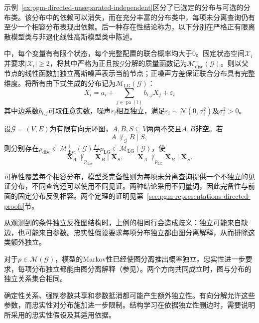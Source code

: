 示例~\ref{ex:pgm-directed-unseparated-independent}区分了已选定的分布与可选的分布类。该分布中的依赖可以消失，而在充分丰富的分布类中，每项未分离查询仍有至少一个相容分布表现出依赖。后一种存在性结论称为，以下分别在严格正有限离散模型类与非退化线性高斯模型类中陈述。

中，每个变量有有限个状态，每个完整配置的联合概率均大于$0$。固定状态空间$\mathcal{X}_i$并要求$|\mathcal{X}_i|\geq2$，将其中严格为正且按$\mathcal{G}$分解的质量函数记为$\mathcal{M}_{\mathrm{disc}}^{+}(\mathcal{G})$。则以父节点的线性函数加独立高斯噪声表示当前节点；正噪声方差保证联合分布具有完整维度。将所有由下式生成的分布记为$\mathcal{M}_{\mathrm{LG}}(\mathcal{G})$：
\[
  X_i=a_i+\sum_{j\in\operatorname{pa}(i)}b_{i,j}X_j+\varepsilon_i
\]
其中边系数$b_{i,j}$可取任意实数，噪声$\varepsilon_i$相互独立，满足$\varepsilon_i\sim\mathcal{N}(0,\sigma_i^2)$及$\sigma_i^2>0$。

\begin{theorem}[d-分离在特定模型类中的完备性]
  \label{thm:pgm-directed-completeness}
  设$\mathcal{G}=(V,E)$为有限有向无环图，$A,B,S\subseteq V$两两不交且$A,B$非空。若
  \[
    A\not\perp_{\mathcal{G}}B\mid S,
  \]
  则分别存在$p_{\mathrm{disc}}\in\mathcal{M}_{\mathrm{disc}}^{+}(\mathcal{G})$与$p_{\mathrm{LG}}\in\mathcal{M}_{\mathrm{LG}}(\mathcal{G})$，使
  \begin{equation}
    \bm{X}_A\not\perp_{p_{\mathrm{disc}}}\bm{X}_B\mid\bm{X}_S,
    \qquad
    \bm{X}_A\not\perp_{p_{\mathrm{LG}}}\bm{X}_B\mid\bm{X}_S.
    \label{eq:pgm-directed-completeness}
  \end{equation}
\end{theorem}

可靠性覆盖每个相容分布，模型类完备性则为每项未分离查询提供一个不独立的见证分布，不同查询还可以使用不同见证。两种结论采用不同量词，因此完备性与前面的固定分布反例相容。两个定理的证明见第~\ref{sec:pgm-representations-directed-proofs}节。

从观测到的条件独立反推图结构时，上例的相同行会造成歧义：独立可能来自缺边，也可能来自参数。忠实性假设要求每项分布独立都由图分离解释，从而排除这类额外独立。

对于$p\in\mathcal{M}(\mathcal{G})$，模型的Markov性已经使图分离推出概率独立。忠实性进一步要求，每项分布独立都能由图分离解释（参见）。两个方向共同成立时，图与分布的独立关系集合相同。

确定性关系、强制参数共享和参数抵消都可能产生额外独立性。有向分解允许这些参数，而忠实性对分布施加进一步限制。结构学习在依据独立性删边时，需要说明所采用的忠实性假设及其适用依据。

